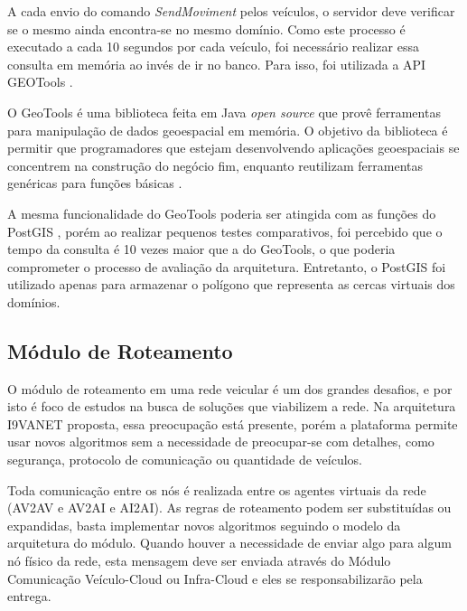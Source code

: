 \documentclass[
	12pt,				%
	oneside,			%
	a4paper,			%
	english,			%
	brazil				%
	]{abntex2ppgsi}
\begin{document}
A cada envio do comando \textit{SendMoviment} pelos veículos, o servidor deve verificar se o mesmo ainda encontra-se no mesmo domínio. Como este processo é executado a cada 10 segundos por cada veículo, foi necessário realizar essa consulta em memória ao invés de ir no banco. Para isso, foi utilizada a API GEOTools \cite{hall2008open}.

O GeoTools é uma biblioteca feita em Java \textit{open source} que provê ferramentas para manipulação de dados geoespacial em memória. O objetivo da biblioteca é permitir que programadores que estejam desenvolvendo aplicações geoespaciais se concentrem na construção do negócio fim, enquanto reutilizam ferramentas genéricas para funções básicas \cite{hall2008open}.

A mesma funcionalidade do GeoTools poderia ser atingida com as funções do PostGIS \cite{obe2015postgis}, porém ao realizar pequenos testes comparativos, foi percebido que o tempo da consulta é 10 vezes maior que a do GeoTools, o que poderia comprometer o processo de avaliação da arquitetura. Entretanto, o PostGIS foi utilizado apenas para armazenar o polígono que representa as cercas virtuais dos domínios.


\subsection{Módulo de Roteamento}

O módulo de roteamento em uma rede veicular é um dos grandes desafios, e por isto é foco de estudos na busca de soluções que viabilizem a rede. Na arquitetura I9VANET proposta, essa preocupação está presente, porém a plataforma permite usar novos algoritmos sem a necessidade de preocupar-se com detalhes, como segurança, protocolo de comunicação ou quantidade de veículos.

Toda comunicação entre os nós é realizada entre os agentes virtuais da rede (AV2AV e AV2AI e AI2AI). As regras de roteamento podem ser substituídas ou expandidas, basta implementar novos algoritmos seguindo o modelo da arquitetura do módulo. Quando houver a necessidade de enviar algo para algum nó físico da rede, esta mensagem deve ser enviada através do Módulo Comunicação Veículo-Cloud ou Infra-Cloud e eles se responsabilizarão pela entrega.

\end{document}

